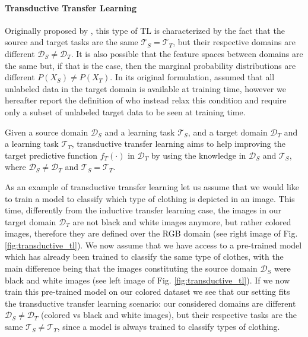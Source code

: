 \paragraph{Transductive Transfer Learning}
Originally proposed by \citet{arnold2007comparative}, this type of TL is characterized by the fact that the source and target tasks are the same $\mathcal{T}_S = \mathcal{T}_T$, but their respective domains are different $\mathcal{D}_S \neq \mathcal{D}_T$. It is also possible that the feature spaces between domains are the same but, if that is the case, then the marginal probability distributions are different $P(X_S)\neq P(X_T)$. In its original formulation, \citet{arnold2007comparative} assumed that all unlabeled data in the target domain is available at training time, however we hereafter report the definition of \citet{pan2009survey} who instead relax this condition and require only a subset of unlabeled target data to be seen at training time.
\begin{definition}
	Given a source domain $\mathcal{D}_S$ and a learning task $\mathcal{T}_S$, and a target domain $\mathcal{D}_T$ and a learning task $\mathcal{T}_T$, transductive transfer learning aims to help improving the target predictive function $f_T(\cdot)$ in $\mathcal{D}_T$ by using the knowledge in $\mathcal{D}_S$ and $\mathcal{T}_S$, where $\mathcal{D}_S \neq \mathcal{D}_T$ and $\mathcal{T}_S = \mathcal{T}_T$. 
\end{definition}
As an example of transductive transfer learning let us assume that we would like to train a model to classify which type of clothing is depicted in an image. This time, differently from the inductive transfer learning case, the images in our target domain $\mathcal{D}_T$ are not black and white images anymore, but rather colored images, therefore they are defined over the RGB domain (see right image of Fig. \ref{fig:transductive_tl}). We now assume that we have access to a pre-trained model which has already been trained to classify the same type of clothes, with the main difference being that the images constituting the source domain $\mathcal{D}_S$ were black and white images (see left image of Fig. \ref{fig:transductive_tl}). If we now train this pre-trained model on our colored dataset we see that our setting fits the transductive transfer learning scenario: our considered domains are different $\mathcal{D}_S \neq \mathcal{D}_T$ (colored vs black and white images), but their respective tasks are the same  $\mathcal{T}_S \neq \mathcal{T}_T$, since a model is always trained to classify types of clothing.


